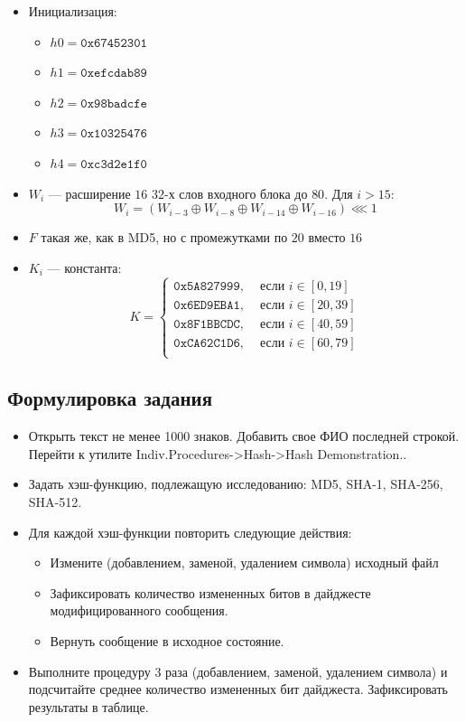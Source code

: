\documentclass[a4paper, 14pt]{extarticle}
\begin{document}
\begin{itemize}
    \item Инициализация:
        \begin{itemize}
            \item $h0 = \mathtt{0x67452301}$
            \item $h1 = \mathtt{0xefcdab89}$
            \item $h2 = \mathtt{0x98badcfe}$
            \item $h3 = \mathtt{0x10325476}$
            \item $h4 = \mathtt{0xc3d2e1f0}$
    \end{itemize}
    \item $W_i$ --- расширение $16$ $32$-х слов входного блока до $80$. Для $i > 15$:
    \begin{equation}
        W_i = (W_{i-3} \oplus W_{i-8} \oplus W_{i-14} \oplus W_{i-16}) \lll 1
    \end{equation}
    \item $F$ такая же, как в MD5, но с промежутками по $20$ вместо $16$
    \item $K_i$ --- константа:
    \begin{equation}
        K = \begin{cases}
            \mathtt{0x5A827999} , &\text{ если } i \in [0, 19]\\
            \mathtt{0x6ED9EBA1} , &\text{ если } i \in [20, 39]\\
            \mathtt{0x8F1BBCDC} , &\text{ если } i \in [40, 59]\\
            \mathtt{0xCA62C1D6} , &\text{ если } i \in [60, 79]\\
        \end{cases}
    \end{equation}
\end{itemize}

\subsection{Формулировка задания}
\begin{itemize}
    \item  Открыть текст не менее 1000 знаков. Добавить свое ФИО последней строкой. Перейти к утилите Indiv.Procedures->Hash->Hash Demonstration..
    \item  Задать хэш-функцию, подлежащую исследованию: MD5, SHA-1, SHA-256, SHA-512.
    \item  Для каждой хэш-функции повторить следующие действия:
    \begin{itemize}
        \item  Измените (добавлением, заменой, удалением символа) исходный файл
        \item  Зафиксировать количество измененных битов в дайджесте модифицированного сообщения.
        \item  Вернуть сообщение в исходное состояние.
    \end{itemize}
    \item  Выполните процедуру 3 раза (добавлением, заменой, удалением символа) и подсчитайте среднее количество измененных бит дайджеста.  Зафиксировать результаты в таблице.
\end{itemize}
\end{document}
